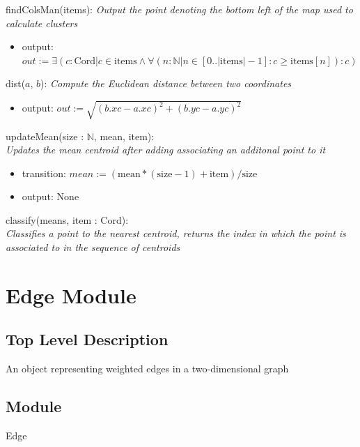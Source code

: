 \documentclass[12pt]{article}
\begin{document}
\noindent
findColsMan(items):
\textit{Output the point denoting the bottom left of the map used to calculate clusters}
\begin{itemize}
\item output: $out := \exists (c : \mbox{Cord} | c \in \mbox{items} \land
                      \forall (n : \mathbb{N} | n \in [0..|\mbox{items}|-1] : 
                      c \geq \mbox{items}[n]) : c)$
\end{itemize}

\noindent
dist($a$, $b$):
\textit{Compute the Euclidean distance between two coordinates}
\begin{itemize}
\item output: $out := \sqrt{(b.xc-a.xc)^{2} + (b.yc-a.yc)^{2}}$
\end{itemize}

\noindent
updateMean(size : $\mathbb{N}$, mean, item):\\
\textit{Updates the mean centroid after adding associating an additonal point to it}
\begin{itemize}
\item transition: $mean := (\mbox{mean}*(\mbox{size}-1) + \mbox{item})/\mbox{size}$
\item output: None
\end{itemize}

\noindent
classify(means, item : Cord):\\
\textit{Classifies a point to the nearest centroid, returns the index in which the
point is associated to in the sequence of centroids}

\newpage

\section*{Edge Module}

\subsection* {Top Level Description}

An object representing weighted edges in a two-dimensional graph

\subsection*{Module}

Edge
\end{document}
